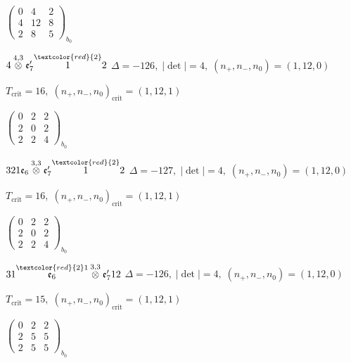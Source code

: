 \documentclass[10pt]{article}
\begin{document}
\hspace{2em}$\left(\begin{smallmatrix}0 & 4 & 2 \\ 4 & 12 & 8 \\ 2 & 8 & 5\end{smallmatrix}\right)_{\!b_0}$

\smallskip

$4\overset{4,3}{\otimes}\mathfrak{e}_7'\overset{\textcolor{red}{2}}{1}2$ \quad $\Delta=-126,\; |\det|=4,\; (n_+,n_-,n_0)=(1,12,0)$

\hspace{1em}$T_{\text{crit}}=16,\; (n_+,n_-,n_0)_{\text{crit}}=(1,12,1)$

\hspace{2em}$\left(\begin{smallmatrix}0 & 2 & 2 \\ 2 & 0 & 2 \\ 2 & 2 & 4\end{smallmatrix}\right)_{\!b_0}$

\smallskip

$321\mathfrak{e}_6\overset{3,3}{\otimes}\mathfrak{e}_7'\overset{\textcolor{red}{2}}{1}2$ \quad $\Delta=-127,\; |\det|=4,\; (n_+,n_-,n_0)=(1,12,0)$

\hspace{1em}$T_{\text{crit}}=16,\; (n_+,n_-,n_0)_{\text{crit}}=(1,12,1)$

\hspace{2em}$\left(\begin{smallmatrix}0 & 2 & 2 \\ 2 & 0 & 2 \\ 2 & 2 & 4\end{smallmatrix}\right)_{\!b_0}$

\smallskip

$31\overset{\textcolor{red}{2}1}{\mathfrak{e}_6}\overset{3,3}{\otimes}\mathfrak{e}_7'12$ \quad $\Delta=-126,\; |\det|=4,\; (n_+,n_-,n_0)=(1,12,0)$

\hspace{1em}$T_{\text{crit}}=15,\; (n_+,n_-,n_0)_{\text{crit}}=(1,12,1)$

\hspace{2em}$\left(\begin{smallmatrix}0 & 2 & 2 \\ 2 & 5 & 5 \\ 2 & 5 & 5\end{smallmatrix}\right)_{\!b_0}$
\end{document}
